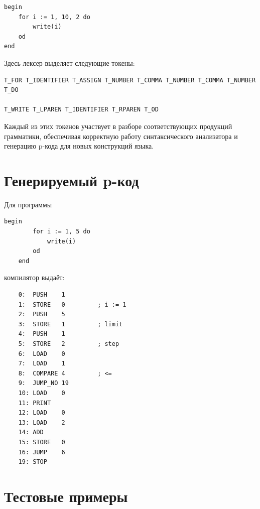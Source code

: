 \documentclass[areasetadvanced]{scrartcl}
\begin{document}
\begin{verbatim}
begin
    for i := 1, 10, 2 do
        write(i)
    od
end
\end{verbatim}

Здесь лексер выделяет следующие токены:
\begin{verbatim}
T_FOR T_IDENTIFIER T_ASSIGN T_NUMBER T_COMMA T_NUMBER T_COMMA T_NUMBER T_DO

T_WRITE T_LPAREN T_IDENTIFIER T_RPAREN T_OD
\end{verbatim}

Каждый из этих токенов участвует в разборе соответствующих продукций грамматики, обеспечивая корректную работу синтаксического анализатора и генерацию p-кода для новых конструкций языка.
    
\newpage
\section{Генерируемый p-код}
    
    Для программы
    \begin{lstlisting}[basicstyle=\small\ttfamily]
    begin
        for i := 1, 5 do
            write(i)
        od
    end
    \end{lstlisting}
    компилятор выдаёт:
    
    \begin{verbatim}
    0:  PUSH    1
    1:  STORE   0         ; i := 1
    2:  PUSH    5
    3:  STORE   1         ; limit
    4:  PUSH    1
    5:  STORE   2         ; step
    6:  LOAD    0
    7:  LOAD    1
    8:  COMPARE 4         ; <=
    9:  JUMP_NO 19
    10: LOAD    0
    11: PRINT
    12: LOAD    0
    13: LOAD    2
    14: ADD
    15: STORE   0
    16: JUMP    6
    19: STOP
    \end{verbatim}
    \newpage
    \section{Тестовые примеры}
    
\end{document}
